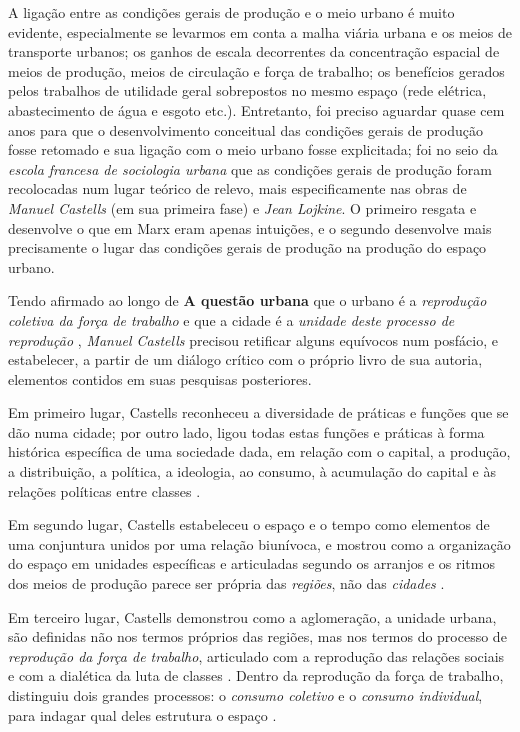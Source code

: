 A ligação entre as condições gerais de produção e o meio urbano é muito evidente, especialmente se levarmos em conta a malha viária urbana e os meios de transporte urbanos; os ganhos de escala decorrentes da concentração espacial de meios de produção, meios de circulação e força de trabalho; os benefícios gerados pelos trabalhos de utilidade geral sobrepostos no mesmo espaço (rede elétrica, abastecimento de água e esgoto etc.). Entretanto, foi preciso aguardar quase cem anos para que o desenvolvimento conceitual das condições gerais de produção fosse retomado e sua ligação com o meio urbano fosse explicitada; foi no seio da \textit{escola francesa de sociologia urbana} que as condições gerais de produção foram recolocadas num lugar teórico de relevo, mais especificamente nas obras de \textit{Manuel Castells} (em sua primeira fase) e \textit{Jean Lojkine}. O primeiro resgata e desenvolve o que em Marx eram apenas intuições, e o segundo desenvolve mais precisamente o lugar das condições gerais de produção na produção do espaço urbano.

Tendo afirmado ao longo de \textbf{A questão urbana} que o urbano é a \textit{reprodução coletiva da força de trabalho} e que a cidade é a \textit{unidade deste processo de reprodução} \cite[p.~550]{CASTELLS2000}, \textit{Manuel Castells} precisou retificar alguns equívocos num posfácio, e estabelecer, a partir de um diálogo crítico com o próprio livro de sua autoria, elementos contidos em suas pesquisas posteriores. 

Em primeiro lugar, Castells reconheceu a diversidade de práticas e funções que se dão numa cidade; por outro lado, ligou todas estas funções e práticas à forma histórica específica de uma sociedade dada, em relação com o capital, a produção, a distribuição, a política, a ideologia, ao consumo, à acumulação do capital e às relações políticas entre classes \cite[p.~550-551]{CASTELLS2000}. 

Em segundo lugar, Castells estabeleceu o espaço e o tempo como elementos de uma conjuntura unidos por uma relação biunívoca, e mostrou como a organização do espaço em unidades específicas e articuladas segundo os arranjos e os ritmos dos meios de produção parece ser própria das \textit{regiões}, não das \textit{cidades} \cite[p.~554-555]{CASTELLS2000}.

Em terceiro lugar, Castells demonstrou como a aglomeração, a unidade urbana, são definidas não nos termos próprios das regiões, mas nos termos do processo de \textit{reprodução da força de trabalho}, articulado com a reprodução das relações sociais e com a dialética da luta de classes \cite[p.~556-557]{CASTELLS2000}. Dentro da reprodução da força de trabalho, distinguiu dois grandes processos: o \textit{consumo coletivo} e o \textit{consumo individual}, para indagar qual deles estrutura o espaço \cite[p.~557]{CASTELLS2000}. 

